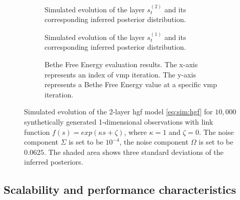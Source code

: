 \begin{figure}
  \centering
  \begin{subfigure}[t]{0.315\textwidth}
    \centering
    \caption{Simulated evolution of the layer $s_t^{(2)}$ and its corresponding inferred posterior distribution.}
    \label{fig:sim:hgf_inference_state_2}
  \end{subfigure}
  \hfill
  \begin{subfigure}[t]{0.315\textwidth}
    \centering
    \caption{Simulated evolution of the layer $s_t^{(1)}$ and its corresponding inferred posterior distribution.}
    \label{fig:sim:hgf_inference_state_1}
  \end{subfigure}
  \hfill
  \begin{subfigure}[t]{0.315\textwidth}
    \centering
    \caption{Bethe Free Energy evaluation results.
      The x-axis represents an index of \ac{vmp} iteration.
      The y-axis represents a Bethe Free Energy value at a specific \ac{vmp} iteration.
    }
    \label{fig:sim:hgf_inference_free_energy}
  \end{subfigure}
  \caption{
    Simulated evolution of the 2-layer \ac{hgf} model \eqref{eq:sim:hgf} for $10,000$ synthetically generated 1-dimensional observations with link function $f(s) = exp(\kappa s + \zeta)$, where $\kappa = 1$ and $\zeta = 0$.
    The noise component $\Sigma$ is set to be $10^{-4}$, the noise component $\Omega$ is set to be
    $0.0625$.
    The shaded area shows three standard deviations of the inferred posteriors.
  }
  \label{fig:sim:hgf_inference_states}
\end{figure}

\subsection{Scalability and performance characteristics}

